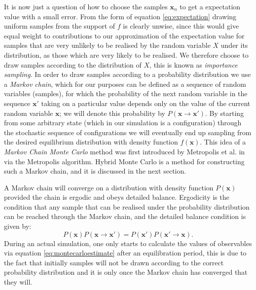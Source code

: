 \documentclass[12pt]{article}
\begin{document}
    It is now just a question of how to choose the samples $\bm{x}_n$ to get a expectation value with a small error. From the form of equation \ref{eq:expectation} drawing uniform samples from the support of $f$ is clearly unwise, since this would give equal weight to contributions to our approximation of the expectation value for samples that are very unlikely to be realised by the random variable $X$ under its distribution, as those which are very likely to be realised. We therefore choose to draw samples according to the distribution of $X$, this is known as \textit{importance sampling}. In order to draw samples according to a probability distribution we use a \textit{Markov chain}, which for our purposes can be defined as a sequence of random variables (samples), for which the probability of the next random variable in the sequence $\bm{x}'$ taking on a particular value depends only on the value of the current random variable $\bm{x}$; we will denote this probability by $P\left(\bm{x}\rightarrow \bm{x}'\right)$. By starting from some arbitrary state (which in our simulation is a configuration) through the stochastic sequence of configurations we will eventually end up sampling from the desired equilibrium distribution with density function $f\left(\bm{x}\right)$. This idea of a \textit{Markov Chain Monte Carlo} method was first introduced by Metropolis et al. in \cite{metropolis_rosenbluth_rosenbluth_teller_teller_1953} via the Metropolis algorithm. Hybrid Monte Carlo is a method for constructing such a Markov chain, and it is discussed in the next section. 

    A Markov chain will converge on a distribution with density function $P\left(\bm{x}\right)$ provided the chain is ergodic and obeys detailed balance. Ergodicity is the condition that any sample that can be realised under the probability distribution can be reached through the Markov chain, and the detailed balance condition is given by: 
    \begin{equation}
        \label{eq:detailedbalance}
        P\left(\bm{x}\right)P\left(\bm{x}\rightarrow \bm{x}'\right)=P\left(\bm{x}'\right)P\left(\bm{x}'\rightarrow \bm{x}\right).
    \end{equation}
    During an actual simulation, one only starts to calculate the values of observables via equation \ref{eq:montecarloestimate} after an equilibration period, this is due to the fact that initially samples will not be drawn according to the correct probability distribution and it is only once the Markov chain has converged that they will. 
\end{document}
